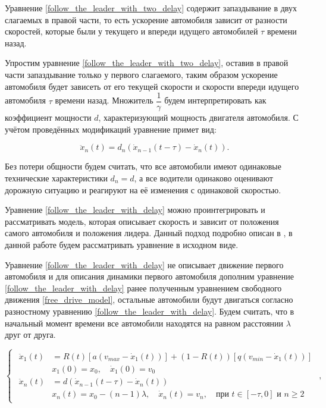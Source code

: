 \documentclass[12pt, a4paper]{extarticle}
\numberwithin{equation}{section}
\begin{document}
Уравнение \eqref{follow_the_leader_with_two_delay} содержит запаздывание в двух слагаемых в правой части, то есть ускорение автомобиля зависит от разности скоростей, которые были у текущего и впереди идущего автомобилей $\tau$ времени назад.

Упростим уравнение \eqref{follow_the_leader_with_two_delay}, оставив в правой части запаздывание только у первого слагаемого, таким образом ускорение автомобиля будет зависеть от его текущей скорости и скорости впереди идущего автомобиля $\tau$ времени назад. Множитель $\dfrac{1}{\gamma}$ будем интерпретировать как коэффициент мощности $d$, характеризующий мощность двигателя автомобиля. С учётом проведённых модификаций уравнение примет вид:

\begin{equation} \label{follow_the_leader_with_delay}
\ddot{x}_n(t) = d_{n} (\dot{x}_{n-1}(t-\tau) - \dot{x}_{n}(t)).
\end{equation}

Без потери общности будем считать, что все автомобили имеют одинаковые технические характеристики $d_n = d$, а все водители одинаково оценивают дорожную ситуацию и реагируют на её изменения с одинаковой скоростью.

Уравнение \eqref{follow_the_leader_with_delay} можно проинтегрировать и рассматривать модель, которая описывает скорость и зависит от положения самого автомобиля и положения лидера. Данный подход подробно описан в \cite{Course}, в данной работе будем рассматривать уравнение в исходном виде. 

Уравнение \eqref{follow_the_leader_with_delay} не описывает движение первого автомобиля и для описания динамики первого автомобиля дополним уравнение \eqref{follow_the_leader_with_delay} ранее полученным уравнением свободного движения \eqref{free_drive_model}, остальные автомобили будут двигаться согласно разностному уравнению \eqref{follow_the_leader_with_delay}. Будем считать, что в начальный момент времени все автомобили находятся на равном  расстоянии $\lambda$ друг от друга.

\begin{equation} \label{follow_the_leader_full_model}
\begin{cases}
\begin{split}
\ddot{x}_1(t)& = R(t) \left[ a\left(v_{max}-\dot{x}_1(t) \right)\right] + (1-R(t)) \left[ q\left( v_{min} - \dot{x}_1(t)\right) \right] \\
&x_{1}(0)=x_0, \quad \dot{x}_{1}(0)=v_{0}\\
\ddot{x}_{n}(t)& = d(\dot{x}_{n-1}(t-\tau)-\dot{x}_{n}(t)) \\
&x_n(t)=x_0-(n-1)\lambda, \quad \dot{x}_n(t)=v_{n}, \quad \text{при } t \in [-\tau,0] \text{ и } n\geq2
\end{split}
\end{cases},
\end{equation}
\end{document}
